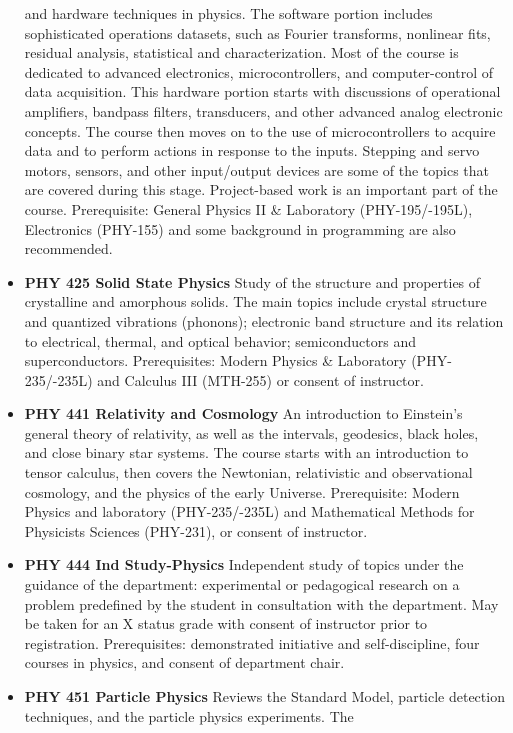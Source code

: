 \documentclass[
  letterpaper,
]{scrbook}
\begin{document}
\begin{itemize}
  and hardware techniques in physics. The software portion includes
  sophisticated operations datasets, such as Fourier transforms,
  nonlinear fits, residual analysis, statistical and characterization.
  Most of the course is dedicated to advanced electronics,
  microcontrollers, and computer-control of data acquisition. This
  hardware portion starts with discussions of operational amplifiers,
  bandpass filters, transducers, and other advanced analog electronic
  concepts. The course then moves on to the use of microcontrollers to
  acquire data and to perform actions in response to the inputs.
  Stepping and servo motors, sensors, and other input/output devices are
  some of the topics that are covered during this stage. Project-based
  work is an important part of the course. Prerequisite: General Physics
  II \& Laboratory (PHY-195/-195L), Electronics (PHY-155) and some
  background in programming are also recommended.
\item
  \textbf{PHY 425 Solid State Physics} Study of the structure and
  properties of crystalline and amorphous solids. The main topics
  include crystal structure and quantized vibrations (phonons);
  electronic band structure and its relation to electrical, thermal, and
  optical behavior; semiconductors and superconductors. Prerequisites:
  Modern Physics \& Laboratory (PHY-235/-235L) and Calculus III
  (MTH-255) or consent of instructor.
\item
  \textbf{PHY 441 Relativity and Cosmology} An introduction to
  Einstein's general theory of relativity, as well as the intervals,
  geodesics, black holes, and close binary star systems. The course
  starts with an introduction to tensor calculus, then covers the
  Newtonian, relativistic and observational cosmology, and the physics
  of the early Universe. Prerequisite: Modern Physics and laboratory
  (PHY-235/-235L) and Mathematical Methods for Physicists Sciences
  (PHY-231), or consent of instructor.
\item
  \textbf{PHY 444 Ind Study-Physics} Independent study of topics under
  the guidance of the department: experimental or pedagogical research
  on a problem predefined by the student in consultation with the
  department. May be taken for an X status grade with consent of
  instructor prior to registration. Prerequisites: demonstrated
  initiative and self-discipline, four courses in physics, and consent
  of department chair.
\item
  \textbf{PHY 451 Particle Physics} Reviews the Standard Model, particle
  detection techniques, and the particle physics experiments. The

\end{itemize}
\end{document}
